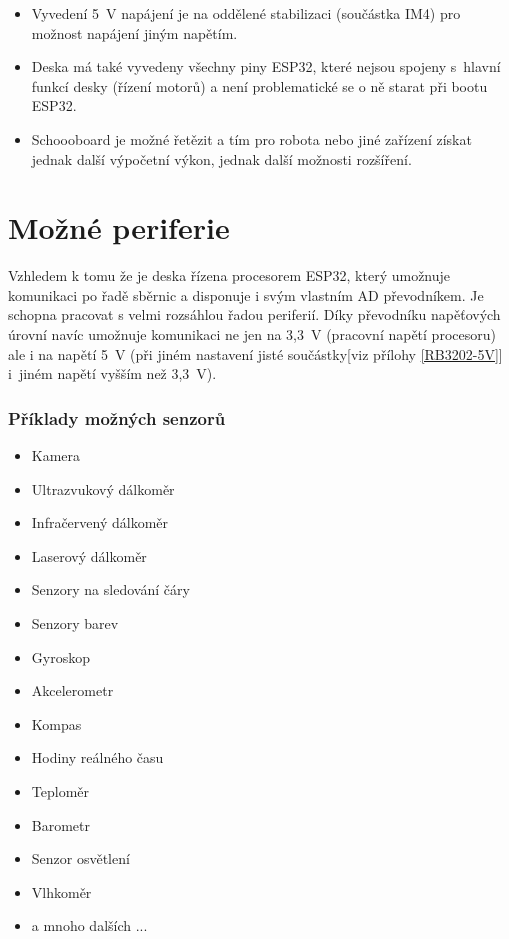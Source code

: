 \documentclass{template/socthesis}
\begin{document}
\begin{itemize}
	\item Vyvedení 5~V napájení je na oddělené stabilizaci (součástka IM4) pro možnost napájení jiným napětím.
	
	\item Deska má také vyvedeny všechny piny ESP32, které nejsou spojeny 
	s~hlavní funkcí desky (řízení motorů) a není problematické se o ně starat při bootu ESP32.
	
	\item Schoooboard je možné řetězit a tím pro robota nebo jiné zařízení získat  jednak další výpočetní výkon, jednak další možnosti rozšíření. 
	
	\end{itemize}

\section{Možné periferie}
Vzhledem k tomu že je deska řízena procesorem ESP32, který umožnuje komunikaci po řadě sběrnic a disponuje i svým vlastním AD převodníkem. Je schopna pracovat s velmi rozsáhlou řadou periferií. Díky převodníku na\-pě\-ťo\-vých úrovní navíc umožnuje komunikaci ne jen na 3,3~V (pracovní napětí procesoru) ale i na napětí 5~V (při jiném nastavení jisté součástky[viz přílohy \ref{RB3202-5V}]
 i~jiném napětí vyšším než 3,3~V). 
\subsubsection{Příklady možných senzorů}
\begin{itemize}
	\item Kamera
	\item Ultrazvukový dálkoměr
	\item Infračervený dálkoměr
	\item Laserový dálkoměr
	\item Senzory na sledování čáry
	\item Senzory barev
	\item Gyroskop
	\item Akcelerometr
	\item Kompas
	\item Hodiny reálného času
	\item Teploměr
	\item Barometr
	\item Senzor osvětlení
	\item Vlhkoměr
	\item a mnoho dalších ... 
\end{itemize}
\end{document}
